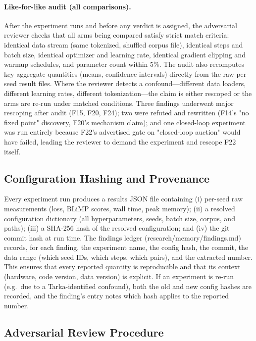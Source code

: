 \paragraph{Like-for-like audit (all comparisons).} After the experiment runs and before any verdict is assigned, the
adversarial reviewer checks that all arms being compared satisfy strict match criteria: identical data stream (same
tokenized, shuffled corpus file), identical steps and batch size, identical optimizer and learning rate, identical
gradient clipping and warmup schedules, and parameter count within 5\%. The audit also recomputes key aggregate
quantities (means, confidence intervals) directly from the raw per-seed result files. Where the reviewer detects a
confound—different data loaders, different learning rates, different tokenization—the claim is either rescoped or
the arms are re-run under matched conditions. Three findings underwent major rescoping after audit (F15, F20, F24);
two were refuted and rewritten (F14's "no fixed point" discovery, F20's mechanism claim); and one closed-loop
experiment was run entirely because F22's advertised gate on "closed-loop auction" would have failed, leading the
reviewer to demand the experiment and rescope F22 itself.

\subsection{Configuration Hashing and Provenance}

Every experiment run produces a results JSON file containing (i) per-seed raw measurements (loss, BLiMP scores, wall
time, peak memory); (ii) a resolved configuration dictionary (all hyperparameters, seeds, batch size, corpus, and
paths); (iii) a SHA-256 hash of the resolved configuration; and (iv) the git commit hash at run time. The findings
ledger (research/memory/findings.md) records, for each finding, the experiment name, the config hash, the commit,
the data range (which seed IDs, which steps, which pairs), and the extracted number. This ensures that every reported
quantity is reproducible and that its context (hardware, code version, data version) is explicit. If an experiment is
re-run (e.g.\ due to a Tarka-identified confound), both the old and new config hashes are recorded, and the finding's
entry notes which hash applies to the reported number.

\subsection{Adversarial Review Procedure}

